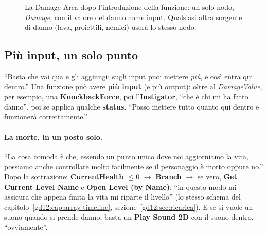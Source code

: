 \begin{figure}[htbp]
\centering
\begin{bpgraph}
\end{bpgraph}
\caption{La Damage Area dopo l'introduzione della funzione: un solo nodo,
\emph{Damage}, con il valore del danno come input. Qualsiasi altra sorgente di
danno (lava, proiettili, nemici) userà lo stesso nodo.}
\label{gd13:fig:damage-v2}
\end{figure}

\subsection{Più input, un solo punto}

``Basta che vai qua e gli aggiungi: sugli input puoi mettere \emph{più}, e così
entra qui dentro.'' Una funzione può avere \textbf{più input} (e più output):
oltre al \emph{DamageValue}, per esempio, una \textbf{KnockbackForce}, poi
l'\textbf{Instigator}, ``che è chi mi ha fatto danno'', poi se applica qualche
\textbf{status}. ``Posso mettere tutto quanto qui dentro e funzionerà
correttamente.''

\paragraph{La morte, in un posto solo.} ``La cosa comoda è che, essendo un punto
unico dove noi aggiorniamo la vita, possiamo anche controllare molto facilmente
se il personaggio è morto oppure no.'' Dopo la sottrazione:
\textbf{CurrentHealth $\leq 0$} $\rightarrow$ \textbf{Branch} $\rightarrow$ se
vero, \textbf{Get Current Level Name} e \textbf{Open Level (by Name)}: ``in
questo modo mi assicura che appena finita la vita mi riparte il livello''
(lo stesso schema del capitolo~\ref{gd12:cap:array-timeline},
sezione~\ref{gd12:sec:ricarica}). E se si vuole un suono quando si prende danno,
basta un \textbf{Play Sound 2D} con il suono dentro, ``ovviamente''.


